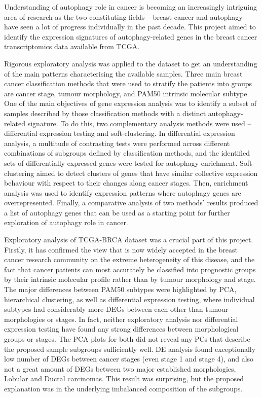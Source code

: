 Understanding of autophagy role in cancer is becoming an increasingly intriguing area of research as the two constituting fields -- breast cancer and autophagy -- have seen a lot of progress individually in the past decade. This project aimed to identify the expression signatures of autophagy-related genes in the breast cancer transcriptomics data available from TCGA. 

Rigorous exploratory analysis was applied to the dataset to get an understanding of the main patterns characterising the available samples. Three main breast cancer classification methods that were used to stratify the patients into groups are cancer stage, tumour morphology, and PAM50 intrinsic molecular subtype. One of the main objectives of gene expression analysis was to identify a subset of samples described by those classification methods with a distinct autophagy-related signature. To do this, two complementary analysis methods were used -- differential expression testing and soft-clustering. 
In differential expression analysis, a multitude of contrasting tests were performed across different combinations of subgroups defined by classification methods, and the identified sets of differentially expressed genes were tested for autophagy enrichment. Soft-clustering aimed to detect clusters of genes that have similar collective expression behaviour with respect to their changes along cancer stages. Then, enrichment analysis was used to identify expression patterns where autophagy genes are overrepresented. Finally, a comparative analysis of two methods' results produced a list of autophagy genes that can be used as a starting point for further exploration of autophagy role in cancer.

Exploratory analysis of TCGA-BRCA dataset was a crucial part of this project. Firstly, it has confirmed the view that is now widely accepted in the breast cancer research community on the extreme heterogeneity of this disease, and the fact that cancer patients can most accurately be classified into prognostic groups by their intrinsic molecular profile rather than by tumour morphology and stage. The major differences between PAM50 subtypes were highlighted by PCA, hierarchical clustering, as well as differential expression testing, where individual subtypes had considerably more DEGs between each other than tumour morphologies or stages. In fact, neither exploratory analysis nor differential expression testing have found any strong differences between morphological groups or stages. The PCA plots for both did not reveal any PCs that describe the proposed sample subgroups sufficiently well. DE analysis found exceptionally low number of DEGs between cancer stages (even stage 1 and stage 4), and also not a great amount of DEGs between two major established morphologies, Lobular and Ductal carcinomas. This result was surprising, but the proposed explanation was in the underlying imbalanced composition of the subgroups. 

